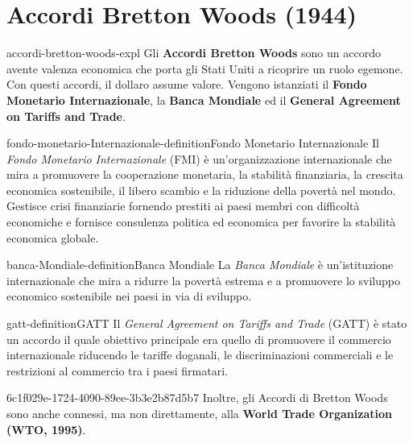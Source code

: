 \documentclass[preview]{standalone}
\begin{document}
\genpage

\section{Accordi Bretton Woods (1944)}

\begin{snippet}{accordi-bretton-woods-expl}
    Gli \textbf{Accordi Bretton Woods} sono un accordo avente valenza economica
    che porta gli Stati Uniti a ricoprire un ruolo egemone. Con questi accordi, il
    dollaro assume valore. Vengono istanziati il \textbf{Fondo Monetario Internazionale},
    la \textbf{Banca Mondiale} ed il \textbf{General Agreement on Tariffs and Trade}.
\end{snippet}

\begin{snippetdefinition}{fondo-monetario-Internazionale-definition}{Fondo Monetario Internazionale}
    Il \textit{Fondo Monetario Internazionale} (FMI) è un'organizzazione internazionale che mira a promuovere
    la cooperazione monetaria, la stabilità finanziaria,
    la crescita economica sostenibile, il libero scambio e la riduzione della povertà nel mondo.
    Gestisce crisi finanziarie fornendo prestiti ai paesi membri con difficoltà economiche e
    fornisce consulenza politica ed economica per favorire la stabilità economica globale.
\end{snippetdefinition}

\begin{snippetdefinition}{banca-Mondiale-definition}{Banca Mondiale}
    La \textit{Banca Mondiale} è un'istituzione internazionale che mira a ridurre la povertà
    estrema e a promuovere lo sviluppo economico sostenibile nei paesi in via di sviluppo.
\end{snippetdefinition}

\begin{snippetdefinition}{gatt-definition}{GATT}
    Il \textit{General Agreement on Tariffs and Trade} (GATT)
    è stato un accordo il quale obiettivo principale era quello
    di promuovere il commercio internazionale riducendo le tariffe doganali,
    le discriminazioni commerciali e le restrizioni al commercio tra i paesi firmatari. 
\end{snippetdefinition}

\begin{snippet}{6c1f029e-1724-4090-89ee-3b3e2b87d5b7}
    Inoltre, gli Accordi di Bretton Woods sono anche connessi, ma non direttamente,
    alla \textbf{World Trade Organization (WTO, 1995)}.
\end{snippet}
\end{document}
